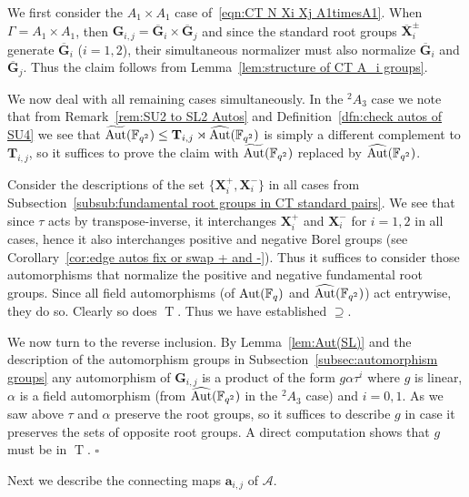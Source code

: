 \documentclass[12pt]{amsart}
\theoremstyle{definition}
\newcommand{\bpf}{\noindent{\bf Proof}\hspace{7pt}}
\newcommand{\epf}{\qed}
\newcommand{\twA}{{}^2\! {A}}
\newcommand{\Aut}{\mathop{\rm Aut}\nolimits}
\renewcommand{\bar}{\overline}
\newcommand{\FF}{{\mathbb F}}
\DeclareMathOperator{\GD}{T}
\newcommand{\trin}{\tau}
\renewcommand{\qed}{\hfill $\square$}
\newcommand{\amgrpG}{{\mathbf{G}}}
\newcommand{\amgrpT}{{\mathbf{T}}}
\newcommand{\amgrpX}{{\mathbf{X}}}
\newcommand{\ama}{{\mathbf a}}
\newcommand{\bamgrpG}{\bar{\amgrpG}}
\newcommand{\bamgrpX}{\bar{\amgrpX}}
\newcommand{\amA}{{\mathscr{A}}}
\newcommand{\liediag}{\Gamma}
\begin{document}
\bpf
We first consider the $A_1\times A_1$ case of~\eqref{eqn:CT N Xi Xj A1timesA1}.
When $\liediag=A_1\times A_1$, then $\amgrpG_{i,j}=\bamgrpG_i\times\bamgrpG_j$ and since the standard root groups 
 $\bamgrpX_i^\pm$ generate $\bamgrpG_i$ ($i=1,2$), their simultaneous normalizer must also normalize $\bamgrpG_i$ and $\bamgrpG_j$. Thus the claim follows from Lemma~\ref{lem:structure of CT A_i groups}.

We now deal with all remaining cases simultaneously.
In the $\twA_3$ case we note that from Remark~\ref{rem:SU2 to SL2 Autos} and Definition~\ref{dfn:check autos of SU4} we see that $\widetilde{\Aut}(\FF_{q^2})\le \amgrpT_{i,j}\rtimes \widehat{\Aut}(\FF_{q^2})$
 is simply a different complement to $\amgrpT_{i,j}$, so it suffices to prove the claim with $\widetilde{\Aut}(\FF_{q^2})$ replaced by $\widehat{\Aut}(\FF_{q^2})$.

Consider the descriptions of the set $\{\amgrpX_i^+,\amgrpX_i^-\}$ in all cases from Subsection~\ref{subsub:fundamental root groups in CT standard pairs}.
We see that since $\trin$ acts by transpose-inverse, it interchanges $\amgrpX_i^+$ and $\amgrpX_i^-$ for $i=1,2$ in all cases, hence it also interchanges positive and negative Borel groups (see Corollary~\ref{cor:edge autos fix or swap + and -}).
Thus it suffices to consider those automorphisms that normalize the positive and negative fundamental root groups.
Since all field automorphisms (of $\Aut(\FF_q)$ and $\widehat{\Aut}(\FF_{q^2})$) act entrywise, they do so. Clearly so does $\GD$.
Thus we have established $\supseteq$.

We now turn to the reverse inclusion. By Lemma~\ref{lem:Aut(SL)} and the description of the automorphism groups in Subsection~\ref{subsec:automorphism groups} any automorphism of $\amgrpG_{i,j}$ is a product of the form $g\alpha\trin^i$ where $g$ is linear, $\alpha$ is a field automorphism (from $\widehat{\Aut}(\FF_{q^2})$ in the $\twA_3$ case)  and $i=0,1$.
As we saw above $\trin$ and $\alpha$ preserve the root groups, so it suffices to describe $g$ in case it preserves the sets of opposite root groups.
A direct computation shows that $g$ must be in $\GD$.
\epf


\medskip

Next we describe the connecting maps $\ama_{i,j}$ of $\amA$.
\end{document}
